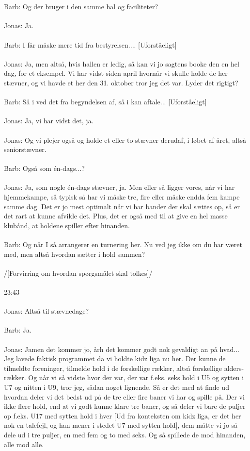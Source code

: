 \\\\
Barb: Og der bruger i den samme hal og faciliteter?
\\\\
Jonas: Ja.
\\\\
Barb: I får måske mere tid fra bestyrelsen.... [Uforståeligt]
\\\\
Jonas: Ja, men altså, hvis hallen er ledig, så kan vi jo sagtens booke den en hel dag, for et eksempel. Vi har vidst siden april hvornår vi skulle holde de her stævner, og vi havde et her den 31. oktober tror jeg det var. Lyder det rigtigt? 
\\\\
Barb: Så i ved det fra begyndelsen af, så i kan aftale... [Uforståeligt]
\\\\
Jonas: Ja, vi har vidst det, ja.
\\\\
Jonas: Og vi plejer også og holde et eller to stævner derudaf, i løbet af året, altså seniorstævner.
\\\\
Barb: Også som én-dags...?
\\\\
Jonas: Ja, som nogle én-dags stævner, ja. Men eller så ligger vores, når vi har hjemmekampe, så typisk så har vi måske tre, fire eller måske endda fem kampe samme dag. Det er jo mest optimalt når vi har bander der skal sættes op, så er det rart at kunne afvikle det. Plus, det er også med til at give en hel masse klubånd, at holdene spiller efter hinanden.
\\\\
Barb: Og når I så arrangerer en turnering her. Nu ved jeg ikke om du har været med, men altså hvordan sætter i hold sammen?
\\\\
/[Forvirring om hvordan spørgsmålet skal tolkes]/
\\\\
23:43
\\\\
Jonas: Altså til stævnedage? 
\\\\
Barb: Ja.
\\\\
Jonas: Jamen det kommer jo, årh det kommer godt nok gevaldigt an på hvad... Jeg lavede faktisk programmet da vi holdte kidz liga nu her. Der kunne de tilmeldte foreninger, tilmelde hold i de forskellige rækker, altså forskellige alders-rækker. Og når vi så vidste hvor der var, der var f.eks. seks hold i U5 og sytten i U7 og nitten i U9, tror jeg, sådan noget lignende. Så er det med at finde ud hvordan deler vi det bedst ud på de tre eller fire baner vi har og spille på. Der vi ikke flere hold, end at vi godt kunne klare tre baner, og så deler vi bare de puljer op f.eks. U17 med sytten hold i hver [Ud fra konteksten om kidz liga, er det her nok en talefejl, og han mener i stedet U7 med sytten hold], dem måtte vi jo så dele ud i tre puljer, en med fem og to med seks. Og så spillede de mod hinanden, alle mod alle.
